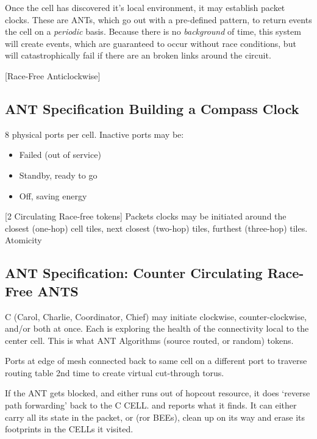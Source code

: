 \documentclass[../../../OAE-SPEC-MAIN.tex]{subfiles}
\begin{document}
Once the cell has discovered it's local environment, it may establish packet clocks. These are ANTs, which go out with a pre-defined pattern, to return events the cell on a \emph{periodic} basis.  Because there is no \emph{background} of time, this system will create events, which are guaranteed to occur without race conditions, but will catastrophically fail if there are an broken links around the circuit.

\vspace{5cm}
[Race-Free Anticlockwise]

\subsection{ANT Specification Building a Compass Clock}
8 physical ports per cell. 
Inactive ports may be:
\begin{itemize}
\item Failed (out of service)
\item Standby, ready to go
\item Off, saving energy
\end{itemize}


[2 Circulating Race-free tokens]
Packets clocks may be initiated around  the closest (one-hop) cell tiles, next closest (two-hop) tiles, furthest (three-hop) tiles. Atomicity 


\subsection{ANT Specification: Counter Circulating Race-Free ANTS}

C (Carol, Charlie, Coordinator, Chief) may initiate clockwise, counter-clockwise, and/or both at once. Each is exploring the health of the connectivity local to the center cell. This is what ANT Algorithms (source routed, or random) tokens. 



Ports at edge of mesh connected back to same cell on a different port to traverse routing table 2nd time to create  virtual cut-through torus.

If the ANT gets blocked, and either runs out of hopcout resource, it does `reverse path forwarding' back to the C CELL. and reports what it finds. It can either carry all its state in the packet, or (ror BEEs), clean up on its way and erase its footprints in the CELLs it visited.
\end{document}

